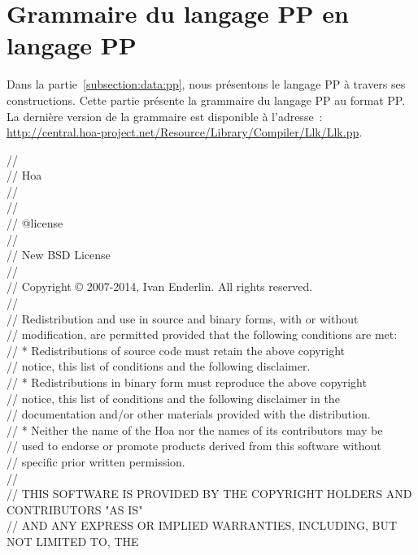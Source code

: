 \section{Grammaire du langage PP en langage PP}
\label{appendices:grammar_of_pp}

Dans la partie~\ref{subsection:data:pp}, nous présentons le langage PP à travers
ses constructions. Cette partie présente la grammaire du langage PP au format
PP. La dernière version de la grammaire est disponible à l'adresse~:
\url{http://central.hoa-project.net/Resource/Library/Compiler/Llk/Llk.pp}.

\begin{bigbigpre}
// \\
// Hoa \\
// \\
// \\
// @license \\
// \\
// New BSD License \\
// \\
// Copyright © 2007-2014, Ivan Enderlin. All rights reserved. \\
// \\
// Redistribution and use in source and binary forms, with or without \\
// modification, are permitted provided that the following conditions are met: \\
//     * Redistributions of source code must retain the above copyright \\
//       notice, this list of conditions and the following disclaimer. \\
//     * Redistributions in binary form must reproduce the above copyright \\
//       notice, this list of conditions and the following disclaimer in the \\
//       documentation and/or other materials provided with the distribution. \\
//     * Neither the name of the Hoa nor the names of its contributors may be \\
//       used to endorse or promote products derived from this software without \\
//       specific prior written permission. \\
// \\
// THIS SOFTWARE IS PROVIDED BY THE COPYRIGHT HOLDERS AND CONTRIBUTORS "AS IS" \\
// AND ANY EXPRESS OR IMPLIED WARRANTIES, INCLUDING, BUT NOT LIMITED TO, THE \\

\end{bigbigpre}
